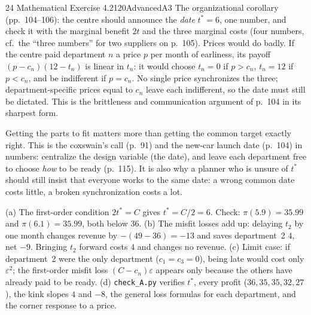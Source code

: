 \begin{exsol}{24}{\MR{} Mathematical Exercise 4.2}{120}{Advanced}{A3}
The organizational corollary (pp.~104--106): the centre should announce the \emph{date} $t^*=6$,
one number, and check it with the marginal benefit $2t$ and the three marginal costs (four numbers,
cf.\ the ``three numbers'' for two suppliers on p.~105). Prices would do badly. If the centre paid
department $n$ a price $p$ per month of earliness, its payoff $(p-c_n)(12-t_n)$ is linear in $t_n$:
it would choose $t_n=0$ if $p>c_n$, $t_n=12$ if $p<c_n$, and be indifferent if $p=c_n$. No single
price synchronizes the three; department-specific prices equal to $c_n$ leave each indifferent, so
the date must still be dictated. This is the brittleness and communication argument of p.~104 in
its sharpest form.

\interp Getting the parts to fit matters more than getting the common target exactly right. This
is the coxswain's call (p.~91) and the new-car launch date (p.~104) in numbers: centralize the
design variable (the date), and leave each department free to choose \emph{how} to be ready
(p.~115). It is also why a planner who is unsure of $t^*$ should still insist that everyone works
to the same date: a wrong common date costs little, a broken synchronization costs a lot.

\verify (a) The first-order condition $2t^*=C$ gives $t^*=C/2=6$. Check: $\pi(5.9)=35.99$ and
$\pi(6.1)=35.99$, both below $36$. (b) The misfit losses add up: delaying $t_2$ by one month changes
revenue by $-(49-36)=-13$ and saves department~2 $4$, net $-9$. Bringing $t_2$ forward costs $4$
and changes no revenue. (c) Limit case: if department~2 were the only department ($c_1=c_3=0$),
being late would cost only $\varepsilon^2$; the first-order misfit loss $(C-c_n)\varepsilon$
appears only because the others have already paid to be ready. (d) \texttt{check\_A.py} verifies
$t^*$, every profit ($36,35,35,32,27$), the kink slopes $4$ and $-8$, the general loss formulas for
each department, and the corner response to a price.

\end{exsol}
